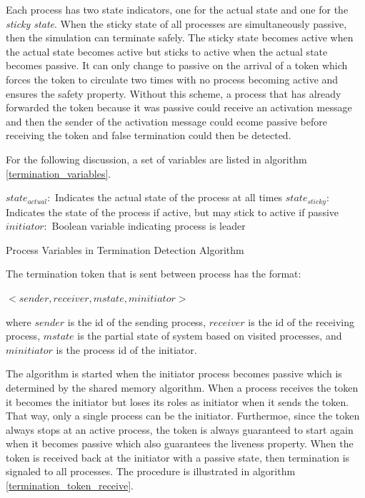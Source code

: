 \documentclass[11pt]{book}
\begin{document}
Each process has two state indicators, one for the actual state and one for the \emph{sticky state}.
When the sticky state of all processes are simultaneously passive, then the simulation can terminate
safely. The sticky state becomes active when the actual state becomes active but sticks to active
when the actual state becomes passive. It can only change to passive on the arrival of a token which
forces the token to circulate two times with no process becoming active and ensures the safety
property. Without this scheme, a process that has already forwarded the token because it was
passive could receive an activation message and then the sender of the activation message could 
ecome passive before receiving the token and false termination could then be detected.

For the following discussion, a set of variables are listed in algorithm \ref{termination_variables}.

\begin{algorithm}
\DontPrintSemicolon
    \boldmath$state_{actual}:$ Indicates the actual state of the process at all times\;
    \boldmath$state_{sticky}:$ Indicates the state of the process if active, but may stick
        to active if passive\;
    \boldmath$initiator:$ Boolean variable indicating process is leader\;
\caption{Process Variables in Termination Detection Algorithm}\label{termination_variables}
\end{algorithm}

\noindent
The termination token that is sent between process has the format:

    $<sender, receiver, mstate, minitiator>$

\noindent
where $sender$ is the id of the sending process, $receiver$ is the id of the receiving
process, $mstate$ is the partial state of system based on visited processes, and $minitiator$
is the process id of the initiator.

The algorithm is started when the initiator process becomes passive which is determined by
the shared memory algorithm. When a process receives the token it becomes the initiator
but loses its roles as initiator when it sends the token. That way, only a single process
can be the initiator. Furthermoe, since the token always stops at an active process, the
token is always guaranteed to start again when it becomes passive which also guarantees
the liveness property. When the token is received back at the initiator with a passive
state, then termination is signaled to all processes. The procedure is illustrated in
algorithm \ref{termination_token_receive}.
\end{document}
